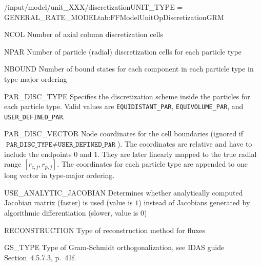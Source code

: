 \begin{condsubgroup}{/input/model/unit\_XXX/discretization}{UNIT\_TYPE = GENERAL\_RATE\_MODEL}{tab:FFModelUnitOpDiscretizationGRM}
  \begin{dataset}[type=int,range={$\geq 1$},length=1]{NCOL}
    Number of axial column discretization cells
  \end{dataset}
  \begin{dataset}[type=int,range={$\geq 1$},length={\texttt{NPARTYPE}}]{NPAR}
    Number of particle (radial) discretization cells for each particle type
  \end{dataset}
  \begin{dataset}[type=int,range={$\geq 0$},length={$\texttt{NPARTYPE} \cdot \texttt{NCOMP}$}]{NBOUND}
    Number of bound states for each component in each particle type in type-major ordering
  \end{dataset}
  \begin{dataset}[type=string,length={\texttt{NPARTYPE}}]{PAR\_DISC\_TYPE}
    Specifies the discretization scheme inside the particles for each particle type.
    Valid values are \texttt{EQUIDISTANT\_PAR}, \texttt{EQUIVOLUME\_PAR}, and \texttt{USER\_DEFINED\_PAR}.
  \end{dataset}
  \begin{dataset}[unit=--,type=double,range={$[0,1]$},length={$\sum_i (\texttt{NPAR}_i + 1)$}]{PAR\_DISC\_VECTOR}
    Node coordinates for the cell boundaries (ignored if $\texttt{PAR\_DISC\_TYPE} \neq \texttt{USER\_DEFINED\_PAR}$).
    The coordinates are relative and have to include the endpoints $0$ and $1$.
    They are later linearly mapped to the true radial range $[r_{c,j}, r_{p,j}]$.
    The coordinates for each particle type are appended to one long vector in type-major ordering.
  \end{dataset}
  \begin{dataset}[type=int,range={$\{0, 1\}$},length=1]{USE\_ANALYTIC\_JACOBIAN}
    Determines whether analytically computed Jacobian matrix (faster) is used (value is $1$) instead of Jacobians generated by algorithmic differentiation (slower, value is $0$)
  \end{dataset}
  \begin{dataset}[type=string,range={\texttt{WENO}},length={1}]{RECONSTRUCTION}
    Type of reconstruction method for fluxes
  \end{dataset}
  \begin{dataset}[type=int,range={$\{0, 1\}$},length=1]{GS\_TYPE}
    Type of Gram-Schmidt orthogonalization, see IDAS guide Section~4.5.7.3, p.~41f.

\end{dataset}
\end{condsubgroup}
